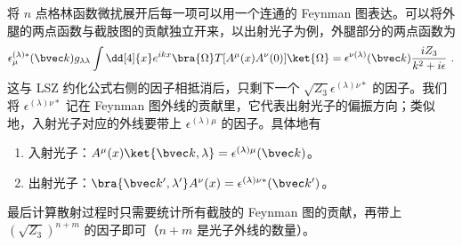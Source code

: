将 $n$ 点格林函数微扰展开后每一项可以用一个连通的 Feynman 图表达。可以将外腿的两点函数与截肢图的贡献独立开来，以出射光子为例，外腿部分的两点函数为
\[
\epsilon_\mu^{(\lambda)*}(\bvec k)g_{\lambda\lambda}\int \dd[4]{x} e^{ikx} \bra{\Omega}T[A^\mu(x)A^\nu(0)]\ket{\Omega}= \epsilon^{\nu(\lambda)}(\bvec k)\frac{iZ_3}{k^2+i\epsilon}~.
\]
这与 LSZ 约化公式右侧的因子相抵消后，只剩下一个 $\sqrt{Z_3}\epsilon^{ (\lambda)\nu*}$ 的因子。我们将 $\epsilon^{(\lambda)\nu*}$ 记在 Feynman 图外线的贡献里，它代表出射光子的偏振方向；类似地，入射光子对应的外线要带上 $\epsilon^{(\lambda)\mu}$ 的因子。具体地有
\begin{enumerate}
\item 入射光子：$A^\mu(x) \ket{\bvec k,\lambda}=\epsilon^{(\lambda)\mu}(\bvec k)$。
\item 出射光子：$\bra{\bvec k',\lambda'}A^\nu(x)=\epsilon^{(\lambda)\nu*}(\bvec k')$。
\end{enumerate}
最后计算散射过程时只需要统计所有截肢的 Feynman 图的贡献，再带上 $(\sqrt{Z_3})^{n+m}$ 的因子即可（$n+m$ 是光子外线的数量）。
